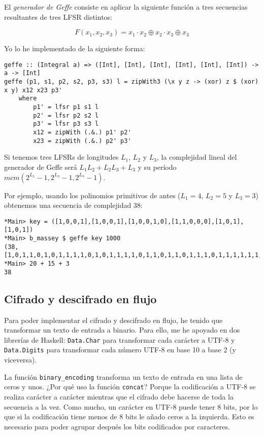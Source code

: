 \documentclass[10pt,spanish]{article}
\begin{document}
El \textit{\textcolor{azul}{generador de Geffe}} consiste en aplicar la siguiente función a tres secuencias resultantes de tres LFSR distintos:

\begin{displaymath}
    F(x_1, x_2, x_3) = x_1 \cdot x_2 \oplus x_2 \cdot x_3 \oplus x_3
\end{displaymath}

Yo lo he implementado de la siguiente forma:

\begin{verbatim}
geffe :: (Integral a) => ([Int], [Int], [Int], [Int], [Int], [Int]) -> a -> [Int]
geffe (p1, s1, p2, s2, p3, s3) l = zipWith3 (\x y z -> (xor) z $ (xor) x y) x12 x23 p3'
    where
        p1' = lfsr p1 s1 l
        p2' = lfsr p2 s2 l
        p3' = lfsr p3 s3 l
        x12 = zipWith (.&.) p1' p2'
        x23 = zipWith (.&.) p2' p3'
\end{verbatim}

Si tenemos tres LFSRs de longitudes $L_1$, $L_2$ y $L_3$, la complejidad lineal del generador de Geffe será $L_1 L_2 + L_2 L_3 + L_3$ y su período $mcm(2^{L_1} - 1, 2^{L_2} -1, 2^{L_3} - 1)$.

Por ejemplo, usando los polinomios primitivos de antes ($L_1 = 4$, $L_2 = 5$ y $L_3 = 3$) obtenemos una secuencia de complejidad $38$:

\begin{verbatim}
*Main> key = ([1,0,0,1],[1,0,0,1],[1,0,0,1,0],[1,1,0,0,0],[1,0,1],[1,0,1])
*Main> b_massey $ geffe key 1000
(38,[1,0,1,1,0,1,0,1,1,1,1,0,1,0,1,1,1,1,0,1,1,0,1,1,0,1,1,1,0,1,1,1,1,1,1,1,0,1,1])
*Main> 20 + 15 + 3
38
\end{verbatim}

\subsection{\textcolor{azul}Cifrado y descifrado en flujo}
Para poder implementar el cifrado y descifrado en flujo, he tenido que transformar un texto de entrada a binario. Para ello, me he apoyado en dos librerías de Haskell: \texttt{Data.Char} para transformar cada carácter a UTF-8 y \texttt{Data.Digits} para transformar cada número UTF-8 en base 10 a base 2 (y viceversa).

La función \texttt{binary\_encoding} transforma un texto de entrada en una lista de ceros y unos. ¿Por qué uso la función \texttt{concat}? Porque la codificación a UTF-8 se realiza carácter a carácter mientras que el cifrado debe hacerse de toda la secuencia a la vez. Como mucho, un carácter en UTF-8 puede tener 8 bits, por lo que si la codificación tiene menos de 8 bits le añado ceros a la izquierda. Esto es necesario para poder agrupar después los bits codificados por caracteres.
\end{document}
